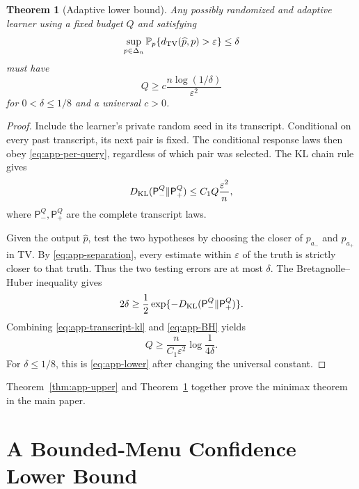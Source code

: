 \documentclass{article}
\newtheorem{theorem}{Theorem}
\newcommand{\Prb}{\mathbb P}
\newcommand{\TV}{d_{\rm TV}}
\begin{document}
\begin{theorem}[Adaptive lower bound]
\label{thm:app-lower}
Any possibly randomized and adaptive learner using a fixed budget $Q$ and
satisfying
\begin{equation}
 \sup_{p\in\Delta_n}
 \Prb_p\{\TV(\widehat p,p)>\varepsilon\}\le\delta
 \label{eq:app-learning-guarantee}
\end{equation}
must have
\begin{equation}
 Q\ge c\frac{n\log(1/\delta)}{\varepsilon^2}
 \label{eq:app-lower}
\end{equation}
for $0<\delta\le1/8$ and a universal $c>0$.
\end{theorem}

\begin{proof}
Include the learner's private random seed in its transcript. Conditional on
every past transcript, its next pair is fixed. The conditional response laws
then obey \eqref{eq:app-per-query}, regardless of which pair was selected.
The KL chain rule gives
\begin{equation}
 D_{\rm KL}(\mathsf P_-^Q\|\mathsf P_+^Q)
 \le C_1Q\frac{\varepsilon^2}{n},
 \label{eq:app-transcript-kl}
\end{equation}
where $\mathsf P_-^Q,\mathsf P_+^Q$ are the complete transcript laws.

Given the output $\widehat p$, test the two hypotheses by choosing the closer
of $p_{a_-}$ and $p_{a_+}$ in TV. By
\eqref{eq:app-separation}, every estimate within $\varepsilon$ of the truth
is strictly closer to that truth. Thus the two testing errors are at most
$\delta$. The Bretagnolle--Huber inequality
\citep{tsybakov2009introduction} gives
\begin{equation}
 2\delta\ge\frac12
 \exp\{-D_{\rm KL}(\mathsf P_-^Q\|\mathsf P_+^Q)\}.
 \label{eq:app-BH}
\end{equation}
Combining \eqref{eq:app-transcript-kl} and \eqref{eq:app-BH} yields
\[
 Q\ge\frac{n}{C_1\varepsilon^2}\log\frac1{4\delta}.
\]
For $\delta\le1/8$, this is \eqref{eq:app-lower} after changing the
universal constant.
\end{proof}

Theorem~\ref{thm:app-upper} and Theorem~\ref{thm:app-lower} together prove
the minimax theorem in the main paper.

\section{A Bounded-Menu Confidence Lower Bound}
\label{app:bounded-menu}
\end{document}
